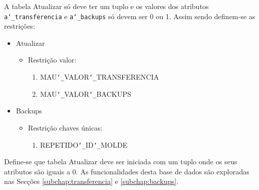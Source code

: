 \documentclass[11pt,twoside,a4paper]{report}
\begin{document}
A tabela Atualizar só deve ter um tuplo e os valores dos atributos \texttt{a\char`_transferencia} e \texttt{a\char`_backups} só devem ser 0 ou 1. Assim sendo definem-se as restrições:
\begin{itemize}[noitemsep]
	\item Atualizar
	\begin{itemize}[noitemsep]
		\item Restrição valor:
		\begin{enumerate}
			\item MAU\texttt{\char`_}VALOR\texttt{\char`_}TRANSFERENCIA
			\item MAU\texttt{\char`_}VALOR\texttt{\char`_}BACKUPS
		\end{enumerate}
	\end{itemize}
	\item Backups
	\begin{itemize}[noitemsep]
		\item Restrição chaves únicas:
		\begin{enumerate}
			\item REPETIDO\texttt{\char`_}ID\texttt{\char`_}MOLDE
		\end{enumerate}
	\end{itemize}
\end{itemize}
Define-se que tabela Atualizar deve ser iniciada com um tuplo onde os seus atributos são iguais a 0. As funcionalidades desta base de dados são exploradas nas Secções \ref{subchap:transferencia} e \ref{subchap:backups}.
\end{document}
